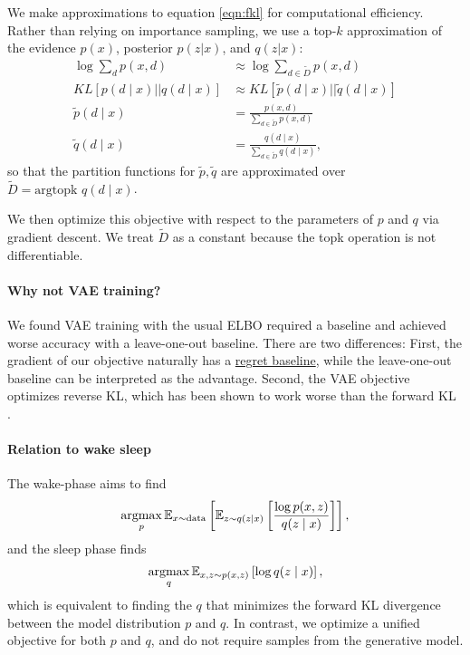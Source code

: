 \documentclass[11pt]{article}
\begin{document}
We make approximations to equation \ref{eqn:fkl} for computational efficiency.
Rather than relying on importance sampling, we use a top-$k$ approximation
of the evidence $p(x)$, posterior $p(z|x)$, and $q(z|x)$:
\begin{align*}
\log\sum_d p(x,d) &\approx \log\sum_{d\in \tilde{D}} p(x,d)\\
KL[p(d\mid x) || q(d \mid x)] &\approx KL[\tilde{p}(d\mid x) || \tilde{q}(d \mid x)]\\
\tilde{p}(d\mid x) &= \frac{p(x,d)}{\sum_{d \in \tilde{D}} p(x,d)}\\
\tilde{q}(d\mid x) &= \frac{q(d\mid x)}{\sum_{d \in \tilde{D}} q(d\mid x)},
\end{align*}
so that the partition functions for $\tilde{p},\tilde{q}$ are approximated over
$\tilde{D} = \text{argtopk } q(d\mid x)$.

We then optimize this objective with respect to the parameters of $p$ and $q$ 
via gradient descent. We treat $\tilde{D}$ as a constant because the topk operation
is not differentiable.

\paragraph{Why not VAE training?} We found VAE training with the usual ELBO
required a baseline and achieved worse accuracy with a leave-one-out baseline.
There are two differences:
First, the gradient of our objective naturally has a
\href{https://github.com/justinchiu/elbos-baselines}{regret baseline},
while the leave-one-out baseline can be interpreted as the advantage.
Second, the VAE objective optimizes reverse KL, which has
been shown to work worse than the forward KL \cite{fkl}.

\paragraph{Relation to wake sleep} The wake-phase aims to find
\begin{equation}
\operatorname*{argmax}_p \mathbb{E}_{x\sim \text{data}}\left[\mathbb{E}_{z\sim q(z\mid x)}\left[\frac{\log p(x,z)}{q(z\mid x)}\right]\right],
\end{equation}
and the sleep phase finds
\begin{equation}
\operatorname*{argmax}_q \mathbb{E}_{x,z\sim p(x,z)}\left[\log q(z\mid x)\right],
\end{equation}
which is equivalent to finding the $q$ that minimizes the forward KL divergence
between the model distribution $p$ and $q$.
In contrast, we optimize a unified objective for both $p$ and $q$,
and do not require samples from the generative model.
\end{document}
